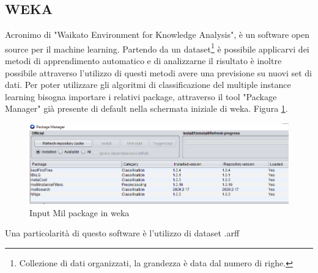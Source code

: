 \subsection{WEKA}
Acronimo di "Waikato Environment for Knowledge Analysis", è un software open source per il machine learning. Partendo da un dataset\footnote{Collezione di dati organizzati, la grandezza è data dal numero di righe.} è possibile applicarvi dei metodi di apprendimento automatico e di analizzarne il risultato è inoltre possibile attraverso l'utilizzo di questi metodi avere una previsione su nuovi set di dati. Per poter utilizzare gli algoritmi di classificazione del multiple instance learning bisogna importare i relativi package, attraverso il tool "Package Manager" già presente di default nella schermata iniziale di weka. Figura \ref{fig:mil pckg}.
\begin{figure}[h]
\centering
    \includegraphics[width=0.9\linewidth]{imgs/capitolo4/packmil.png} 
    \caption{Input Mil package in weka}
    \label{fig:mil pckg}
\end{figure}
\FloatBarrier
Una particolarità di questo software è l'utilizzo di dataset .arff 


